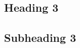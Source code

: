 \clearpage



\begin{appendix}
\hypertarget{heading-3}{%
\section{Heading 3}\label{heading-3}}

\hypertarget{subheading-3}{%
\subsection{Subheading 3}\label{subheading-3}}
\end{appendix}
